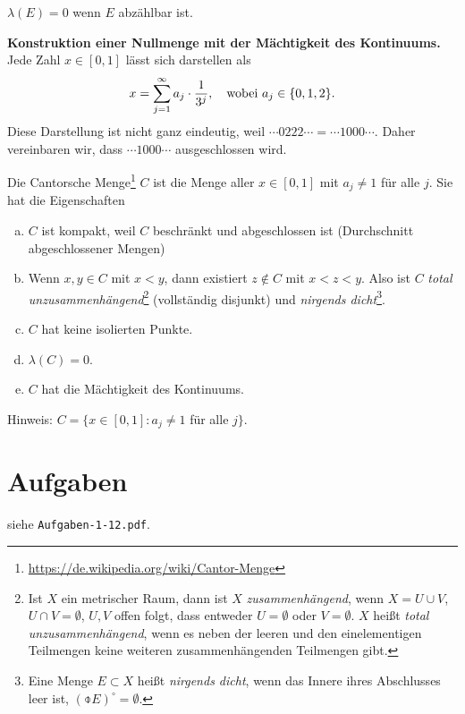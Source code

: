 \begin{rmrk}
 \item $\lambda(E) = 0$ wenn $E$ abzählbar ist. 
 
 \textbf{Konstruktion einer Nullmenge mit der Mächtigkeit des Kontinuums.} Jede Zahl $x \in [0,1]$ lässt sich darstellen als
 \[ x = \sum_{j=1}^\infty a_j \cdot \frac{1}{3^j}, \quad \text{wobei } a_j \in \{ 0,1,2 \}. \]
 Diese Darstellung ist nicht ganz eindeutig, weil $\cdots 0 2 2 2 \cdots = \cdots 1 0 0 0 \cdots$. Daher vereinbaren wir, dass $\cdots 1 0 0 0 \cdots$ ausgeschlossen wird.
 
 Die Cantorsche Menge\footnote{\url{https://de.wikipedia.org/wiki/Cantor-Menge}} $C$ ist die Menge aller $x \in [0,1]$ mit $a_j \ne 1$ für alle $j$. Sie hat die Eigenschaften
 \begin{enumerate}[(a)]
  \item $C$ ist kompakt, weil $C$ beschränkt und abgeschlossen ist (Durchschnitt abgeschlossener Mengen)
  \item Wenn $x,y \in C$ mit $x < y$, dann existiert $z \notin C$ mit $x<z<y$. Also ist $C$ \emph{total unzusammenhängend}\footnote{Ist $X$ ein metrischer Raum, dann ist $X$ \emph{zusammenhängend}, wenn $X = U \cup V$, $U \cap V = \emptyset$, $U,V$ offen folgt, dass entweder $U = \emptyset$ oder $V = \emptyset$. $X$ heißt \emph{total unzusammenhängend}, wenn es neben der leeren und den einelementigen Teilmengen keine weiteren zusammenhängenden Teilmengen gibt.} (vollständig disjunkt) und \emph{nirgends dicht}\footnote{Eine Menge $E \subset X$ heißt \emph{nirgends dicht}, wenn das Innere ihres Abschlusses leer ist, $(\obar{E})^\circ = \emptyset$.}.
  \item $C$ hat keine isolierten Punkte.
  \item $\lambda(C) = 0$.
  \item $C$ hat die Mächtigkeit des Kontinuums.
 \end{enumerate}
 Hinweis: $C = \{ x \in [0,1] : a_j \ne 1$ für alle $j \}$. 
\end{rmrk}

\section{Aufgaben}
siehe \verb+Aufgaben-1-12.pdf+. 

